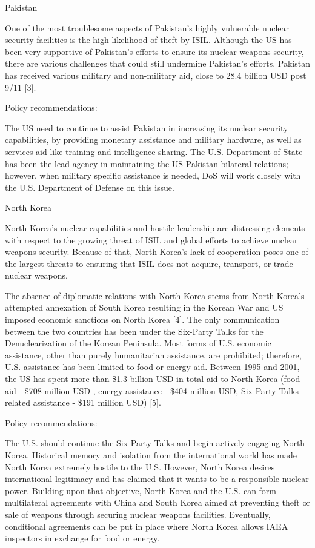 \documentclass{report}
\begin{document}
Pakistan

One of the most troublesome aspects of Pakistan's highly vulnerable nuclear security facilities is the high likelihood of theft by ISIL. Although the US has been very supportive of Pakistan's efforts to ensure its nuclear weapons security, there are various challenges that could still undermine Pakistan's efforts. Pakistan has received various military and non-military aid, close to 28.4 billion USD post 9/11 [3]. 

Policy recommendations:

The US need to continue to assist Pakistan in increasing its nuclear security capabilities, by providing monetary assistance and military hardware, as well as services aid like training and intelligence-sharing. The U.S. Department of State has been the lead agency in maintaining the US-Pakistan bilateral relations; however, when military specific assistance is needed, DoS will work closely with the U.S. Department of Defense on this issue.


North Korea

North Korea's nuclear capabilities and hostile leadership are distressing elements with respect to the growing threat of ISIL and global efforts to achieve nuclear weapons security. Because of that, North Korea's lack of cooperation poses one of the largest threats to ensuring that ISIL does not acquire, transport, or trade nuclear weapons.

The absence of diplomatic relations with North Korea stems from North Korea's attempted annexation of South Korea resulting in the Korean War and US imposed economic sanctions on North Korea [4]. The only communication between the two countries has been under the Six-Party Talks for the Denuclearization of the Korean Peninsula. Most forms of U.S. economic assistance, other than purely humanitarian assistance, are prohibited; therefore, U.S. assistance has been limited to food or energy aid. Between 1995 and 2001, the US has spent more than \$1.3 billion USD in total aid to North Korea (food aid - \$708 million USD , energy assistance - \$404 million USD, Six-Party Talks-related assistance - \$191 million USD) [5].

Policy recommendations:

The U.S. should continue the Six-Party Talks and begin actively engaging North Korea. Historical memory and isolation from the international world has made North Korea extremely hostile to the U.S. However, North Korea desires international legitimacy and has claimed that it wants to be a responsible nuclear power. Building upon that objective, North Korea and the U.S. can form multilateral agreements with China and South Korea aimed at preventing theft or sale of weapons through securing nuclear weapons facilities. Eventually, conditional agreements can be put in place where North Korea allows IAEA inspectors in exchange for food or energy. 
\end{document}
